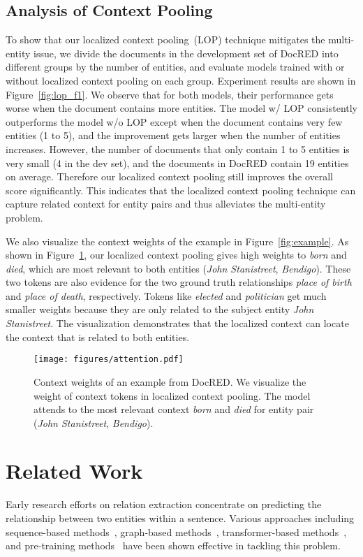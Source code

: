 \documentclass[letterpaper]{article}
\begin{document}
\subsection{Analysis of Context Pooling}
To show that our localized context pooling~(LOP) technique mitigates the multi-entity issue, we divide the documents in the development set of DocRED into different groups by the number of entities, and evaluate models trained with or without localized context pooling on each group.
Experiment results are shown in Figure~\ref{fig:lop_f1}.
We observe that for both models, their performance gets worse when the document contains more entities.
The model w/ LOP consistently outperforms the model w/o LOP except when the document contains very few entities (1 to 5), and the improvement gets larger when the number of entities increases.
However, the number of documents that only contain 1 to 5 entities is very small (4 in the dev set), and the documents in DocRED contain 19 entities on average. 
Therefore our localized context pooling still improves the overall  score significantly.
This indicates that the localized context pooling technique can capture related context for entity pairs and thus alleviates the multi-entity problem.

We also visualize the context weights of the example in Figure~\ref{fig:example}.
As shown in Figure~\ref{fig:attention}, our localized context pooling gives high weights to \textit{born} and \textit{died}, which are most relevant to both entities (\textit{John Stanistreet}, \textit{Bendigo}).
These two tokens are also evidence for the two ground truth relationships \textit{place of birth} and \textit{place of death}, respectively.
Tokens like \textit{elected} and \textit{politician} get much smaller weights because they are only related to the subject entity \textit{John Stanistreet}.
The visualization demonstrates that the localized context can locate the context that is related to both entities.

\begin{figure}[!t]
    \centering
    \texttt{[image: figures/attention.pdf]}
    \caption{Context weights of an example from DocRED. We visualize the weight of context tokens  in localized context pooling. The model attends to the most relevant context \textit{born} and \textit{died} for entity pair (\textit{John Stanistreet}, \textit{Bendigo}).
    }
    \label{fig:attention}
\end{figure}

\section{Related Work}
Early research efforts on relation extraction concentrate on predicting the relationship between two entities within a sentence.
Various approaches including sequence-based methods~\cite{Zeng2014RelationCV,Wang2016RelationCV,Zhang2017PositionawareAA}, graph-based methods~\cite{Miwa2016EndtoEndRE,Zhang2018GraphCO,Guo2019AttentionGG,Wu2019SimplifyingGC}, transformer-based methods~\cite{Alt2019ImprovingRE,Shi2019SimpleBM}, and pre-training methods~\cite{Zhang2019ERNIEEL,Soares2019MatchingTB} have been shown effective in tackling this problem.
\end{document}
